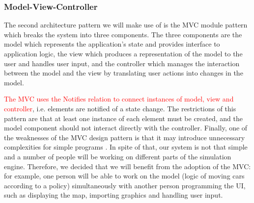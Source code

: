 \documentclass{article}
\begin{document}
	\subsubsection{Model-View-Controller}
	The second architecture pattern we will make use of is the MVC module pattern which breaks the system into three components. 
	The three components are the model which represents the application's state and provides interface to application logic, the view which produces a representation of the model to the user and handles user input, and the controller which manages the interaction between the model and the view by translating user actions into changes in the model. 
	
	\textcolor{red}{The MVC uses the Notifies relation to connect instances of model, view and controller}, i.e. elements are notified of a state change. 
	The restrictions of this pattern are that at least one instance of each element must be created, and the model component should not interact directly with the controller. 
	Finally, one of the weaknesses of the MVC design pattern is that it may introduce unnecessary complexities for simple programs \cite{bass2007software}. 
	In spite of that, our system is not that simple and a number of people will be working on different parts of the simulation engine. Therefore, we decided that we will benefit from the adoption of the MVC: for example, one person will be able to work on the model (logic of moving cars according to a policy) simultaneously with another person programming the UI, such as displaying the map, importing graphics and handling user input. 
	
\end{document}
